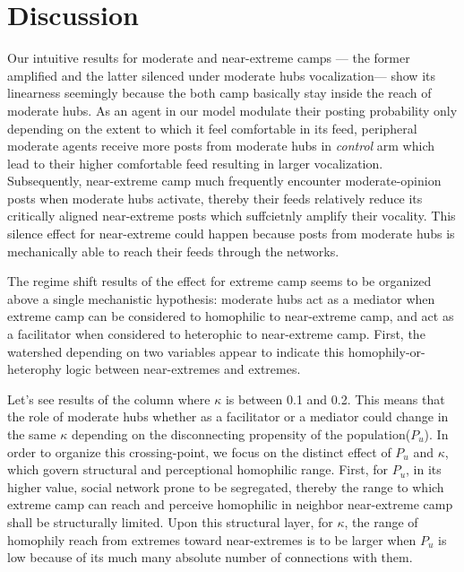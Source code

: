 \documentclass{svproc}
\def\VCR{\kappa}                 %
\begin{document}
\section{Discussion}\label{sec:discussion}
Our intuitive results for moderate and near-extreme camps ---
the former amplified and the latter silenced under moderate hubs 
vocalization--- 
show its linearness seemingly because the both camp basically 
stay inside the reach of moderate hubs. As an agent in our 
model modulate their posting probability only depending on 
the extent to which it feel comfortable in its feed, 
peripheral moderate agents receive more posts from moderate 
hubs in \emph{control} arm which lead to their higher 
comfortable feed resulting in larger vocalization. 
Subsequently, near-extreme camp much frequently encounter 
moderate-opinion posts when moderate hubs activate, thereby 
their feeds relatively reduce its critically aligned near-extreme 
posts which suffcietnly amplify their vocality. 
This silence effect for near-extreme could happen because 
posts from moderate hubs is mechanically able to reach their 
feeds through the networks. 

The regime shift results of the effect for extreme camp 
seems to be organized above a single mechanistic hypothesis: 
moderate hubs act as a mediator when extreme camp can 
be considered to homophilic to near-extreme camp, and 
act as a facilitator when considered to heterophic to 
near-extreme camp. 
First, the watershed depending on two variables appear to 
indicate this homophily-or-heterophy logic between 
near-extremes and extremes. 

Let's see results of the column where $\VCR$ is between 
0.1 and 0.2. This means that the role of moderate hubs 
whether as a facilitator or a mediator could change 
in the same $\VCR$ depending on the disconnecting 
propensity of the population($P_u$). 
In order to organize this crossing-point, 
we focus on the distinct effect of $P_u$ and $\VCR$, 
which govern structural and perceptional homophilic range. 
First, for $P_u$, in its higher value, social network 
prone to be segregated, thereby the range to which extreme 
camp can reach and perceive homophilic 
in neighbor near-extreme camp 
shall be structurally limited. 
Upon this structural layer, for $\VCR$, 
the range of homophily reach from extremes 
toward near-extremes is to be larger 
when $P_u$ is low because of its 
much many absolute number of connections with them. 
\end{document}
